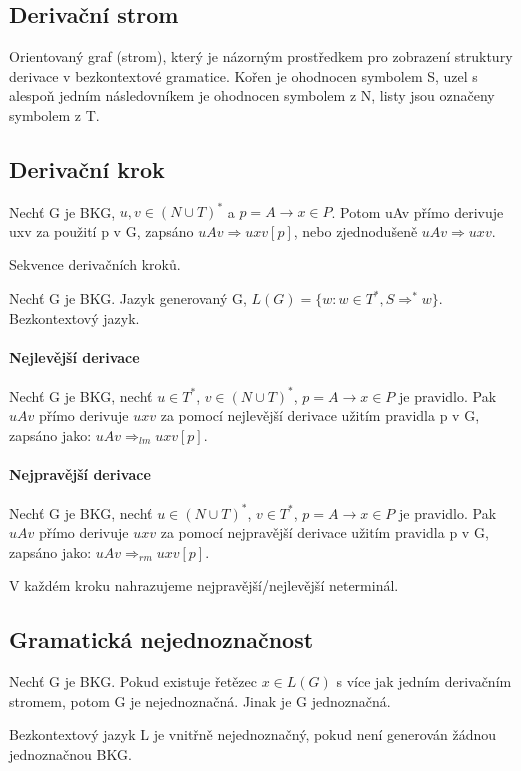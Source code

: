 \documentclass[a4wide]{report}
\begin{document}
\subsection{Derivační strom}

Orientovaný graf (strom), který je názorným prostředkem pro zobrazení struktury derivace v bezkontextové gramatice. Kořen je ohodnocen symbolem S, uzel s alespoň jedním následovníkem je ohodnocen symbolem z N, listy jsou označeny symbolem z T.


\subsection{Derivační krok}
Nechť G je BKG, $u,v \in (N \cup T)^*$ a $p = A \to x \in P$. Potom uAv přímo derivuje uxv za použití p v G, zapsáno $uAv \Rightarrow uxv [p]$, nebo zjednodušeně $uAv \Rightarrow uxv$.

Sekvence derivačních kroků.

Nechť G je BKG. Jazyk generovaný G, $L(G) = \{ w: w \in T^*, S \Rightarrow^* w\}$. Bezkontextový jazyk.

\paragraph{Nejlevější derivace}
Nechť G je BKG, nechť $u \in T^*$, $v \in (N \cup T)^*$, $p = A \to x \in P$ je pravidlo. Pak $uAv$ přímo derivuje $uxv$ za pomocí nejlevější derivace užitím pravidla p v G, zapsáno jako: $uAv \Rightarrow_{lm} uxv [p]$.

\paragraph{Nejpravější derivace}
Nechť G je BKG, nechť $u \in (N \cup T)^*$, $v \in T^*$, $p = A \to x \in P$ je pravidlo. Pak $uAv$ přímo derivuje $uxv$ za pomocí nejpravější derivace užitím pravidla p v G, zapsáno jako: $uAv \Rightarrow_{rm} uxv [p]$.

V každém kroku nahrazujeme nejpravější/nejlevější neterminál.

\subsection{Gramatická nejednoznačnost}

Nechť G je BKG. Pokud existuje řetězec $x \in L(G)$ s více jak jedním derivačním stromem, potom G je nejednoznačná. Jinak je G jednoznačná.

Bezkontextový jazyk L je vnitřně nejednoznačný, pokud není generován žádnou jednoznačnou BKG.
\end{document}
